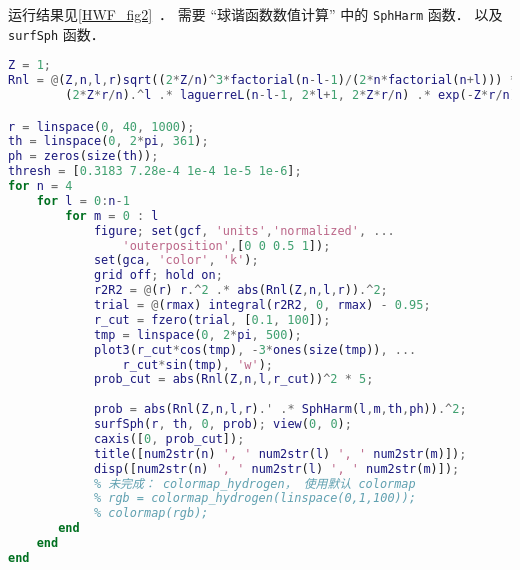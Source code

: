 
\begin{issues}
\issueDraft
\end{issues}

运行结果见\autoref{HWF_fig2}~． 需要 “球谐函数数值计算” 中的 \verb|SphHarm| 函数． 以及 \verb|surfSph| 函数．

\begin{lstlisting}[language=matlab]
Z = 1;
Rnl = @(Z,n,l,r)sqrt((2*Z/n)^3*factorial(n-l-1)/(2*n*factorial(n+l))) *...
        (2*Z*r/n).^l .* laguerreL(n-l-1, 2*l+1, 2*Z*r/n) .* exp(-Z*r/n);

r = linspace(0, 40, 1000);
th = linspace(0, 2*pi, 361);
ph = zeros(size(th));
thresh = [0.3183 7.28e-4 1e-4 1e-5 1e-6];
for n = 4
    for l = 0:n-1
        for m = 0 : l
            figure; set(gcf, 'units','normalized', ...
                'outerposition',[0 0 0.5 1]);
            set(gca, 'color', 'k');
            grid off; hold on;
            r2R2 = @(r) r.^2 .* abs(Rnl(Z,n,l,r)).^2;
            trial = @(rmax) integral(r2R2, 0, rmax) - 0.95;
            r_cut = fzero(trial, [0.1, 100]);
            tmp = linspace(0, 2*pi, 500);
            plot3(r_cut*cos(tmp), -3*ones(size(tmp)), ...
                r_cut*sin(tmp), 'w');
            prob_cut = abs(Rnl(Z,n,l,r_cut))^2 * 5;
            
            prob = abs(Rnl(Z,n,l,r).' .* SphHarm(l,m,th,ph)).^2;
            surfSph(r, th, 0, prob); view(0, 0);
            caxis([0, prob_cut]);
            title([num2str(n) ', ' num2str(l) ', ' num2str(m)]);
            disp([num2str(n) ', ' num2str(l) ', ' num2str(m)]);
            % 未完成： colormap_hydrogen， 使用默认 colormap
            % rgb = colormap_hydrogen(linspace(0,1,100));
            % colormap(rgb);
       end
    end
end
\end{lstlisting}
